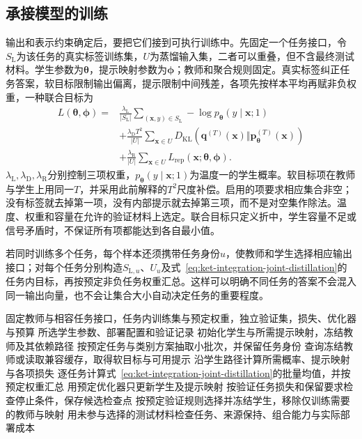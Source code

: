 \subsection{承接模型的训练}
\label{sec:ket-integration-student-training}

输出和表示约束确定后，要把它们接到可执行训练中。先固定一个任务接口，令$S_{\mathrm{L}}$为该任务的真实标签训练集，$U$为蒸馏输入集，二者可以重叠，但不含最终测试材料。学生参数为$\bm{\theta}$，提示映射参数为$\bm{\phi}$；教师和聚合规则固定。真实标签纠正任务答案，软目标限制输出偏离，提示限制中间残差，各项先按样本平均再赋非负权重，一种联合目标为
\begin{equation}
  \begin{aligned}
    L(\bm{\theta},\bm{\phi})={}&
      \frac{\lambda_{\mathrm{L}}}{|S_{\mathrm{L}}|}
      \sum_{(\bm{x},y)\in S_{\mathrm{L}}}
        -\log p_{\bm{\theta}}(y\mid\bm{x};1)\\
      &+\frac{\lambda_{\mathrm{D}}T^2}{|U|}
      \sum_{\bm{x}\in U}
        D_{\mathrm{KL}}\!\left(
          \bm{q}^{(T)}(\bm{x})\Vert
          \bm{p}_{\bm{\theta}}^{(T)}(\bm{x})\right)\\
      &+\frac{\lambda_{\mathrm{R}}}{|U|}
      \sum_{\bm{x}\in U}L_{\mathrm{rep}}(\bm{x};\bm{\theta},\bm{\phi}).
  \end{aligned}
  \label{eq:ket-integration-joint-distillation}
\end{equation}
$\lambda_{\mathrm{L}},\lambda_{\mathrm{D}},\lambda_{\mathrm{R}}$分别控制三项权重，$p_{\bm{\theta}}(y\mid\bm{x};1)$为温度一的学生概率。软目标项在教师与学生上用同一$T$，并采用此前解释的$T^2$尺度补偿。启用的项要求相应集合非空；没有标签就去掉第一项，没有内部提示就去掉第三项，而不是对空集作除法。温度、权重和容量在允许的验证材料上选定。联合目标只定义折中，学生容量不足或信号矛盾时，不保证所有项都能达到各自最小值。

若同时训练多个任务，每个样本还须携带任务身份$u$，使教师和学生选择相应输出接口；对每个任务分别构造$S_{\mathrm{L},u}$、$U_u$及式~\eqref{eq:ket-integration-joint-distillation}的任务内目标，再按预定非负任务权重汇总。这样可以明确不同任务的答案不会混入同一输出向量，也不会让集合大小自动决定任务的重要程度。

\begin{algorithm}[从冻结教师到可部署学生]
  \label{alg:ket-integration-distillation-loop}
  \begin{algorithmic}[1]
    \Require 固定教师与相容任务接口，任务内训练集与预定权重，独立验证集，损失、优化器与预算
    \Ensure 所选学生参数、部署配置和验证记录
    \State 初始化学生与所需提示映射，冻结教师及其依赖路径
      \State 按预定任务与类别方案抽取小批次，并保留任务身份
      \State 查询冻结教师或读取兼容缓存，取得软目标与可用提示
      \State 沿学生路径计算所需概率、提示映射与各项损失
      \State 逐任务计算式~\eqref{eq:ket-integration-joint-distillation}的批量均值，并按预定权重汇总
      \State 用预定优化器只更新学生及提示映射
      \State 按验证任务损失和保留要求检查停止条件，保存候选检查点
    \EndFor
    \State 按预定验证规则选择并冻结学生，移除仅训练需要的教师与映射
    \State 用未参与选择的测试材料检查任务、来源保持、组合能力与实际部署成本
  \end{algorithmic}
\end{algorithm}

